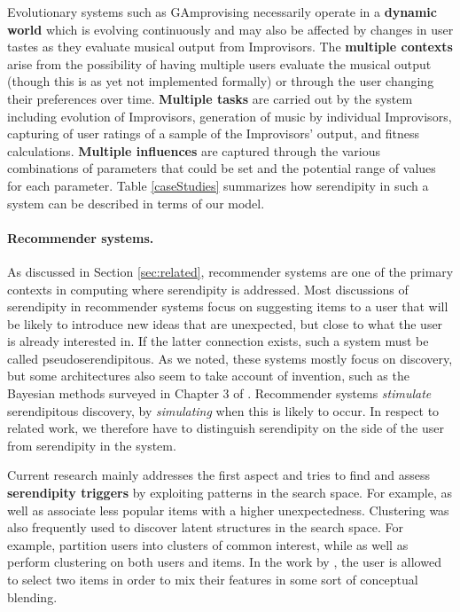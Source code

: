 Evolutionary systems such as GAmprovising necessarily operate in a \textbf{dynamic world} which is evolving continuously and may also be affected by changes in user tastes as they evaluate musical output from Improvisors. The \textbf{multiple contexts} arise from the possibility of having multiple users evaluate the musical output (though this is as yet not implemented formally) or through the user changing their preferences over time. \textbf{Multiple tasks} are carried out by the system including evolution of Improvisors, generation of music by individual Improvisors, capturing of user ratings of a sample of the Improvisors' output, and fitness calculations. \textbf{Multiple influences} are captured through the various combinations of parameters that could be set and the potential range of values for each parameter. Table \ref{caseStudies} summarizes how serendipity in such a system can be described in terms of our model.


\paragraph{Recommender systems.} 
As discussed in Section \ref{sec:related}, recommender systems are one
of the primary contexts in computing where serendipity is addressed. Most discussions of serendipity in recommender systems focus on suggesting items to a user that will be likely to introduce new ideas that are unexpected, but close to what the user is already interested in. If the latter connection exists, such a system must be called pseudoserendipitous. As we noted, these systems mostly focus on discovery, but some architectures also seem to take account of invention, such as the Bayesian methods surveyed in Chapter 3 of . Recommender systems \emph{stimulate} serendipitous discovery, by \emph{simulating} when this is likely to occur. In respect to related work, we therefore have to distinguish serendipity on the side of the user from serendipity in the system. 

Current research mainly addresses the first aspect and tries to find and assess \textbf{serendipity triggers} by exploiting patterns in the search space. For example, \cite{Herlocker2004} as well as \cite{Lu2012} associate less popular items with a higher unexpectedness. Clustering was also frequently used to discover latent structures in the search space. For example, \cite{Kamahara2005} partition users into clusters of common interest, while \cite{Onuma2009} as well as \cite{Zhang2011} perform clustering on both users and items. In the work by \cite{Oku2011}, the user is allowed to select two items in order to mix their features in some sort of conceptual blending.


